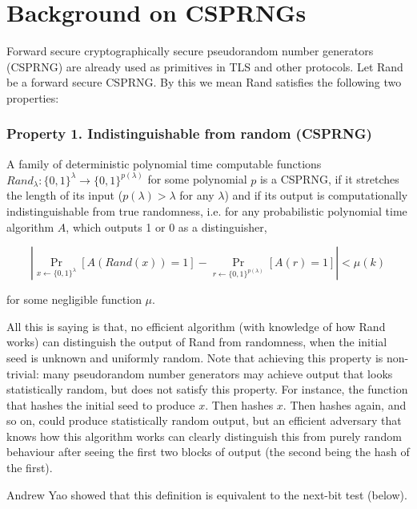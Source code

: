 \documentclass{article}
\begin{document}
\section{Background on CSPRNGs} \label{CSPRNG}
Forward secure cryptographically secure pseudorandom number generators (CSPRNG) are already used as primitives in TLS and other protocols. Let Rand be a forward secure CSPRNG. By this we mean Rand satisfies the following two properties:

\subsubsection*{Property 1. Indistinguishable from random (CSPRNG)}

A family of deterministic polynomial time computable functions $Rand_{\lambda}
\colon \{0, 1\}^{\lambda} \rightarrow \{0, 1 \}^{p(\lambda)}$ for some polynomial
$p$ is a  CSPRNG, if it stretches the length of its input ($p(\lambda) > \lambda$ for any $\lambda$) and if its output is computationally indistinguishable from true randomness, i.e. for any probabilistic polynomial time algorithm $A$, which outputs 1 or 0 as a distinguisher,

$$ \left \vert \Pr_{x\gets\{0,1\}^\lambda}[A(Rand(x))=1] - \Pr_{r\gets\{0,1\}^{p(\lambda)}}[A(r)=1] \right \vert < \mu(k) $$

\noindent for some negligible function $\mu$.

All this is saying is that, no efficient algorithm (with knowledge of how Rand works) can distinguish the output of Rand from randomness, when the initial seed is unknown and uniformly random. Note that achieving this property is non-trivial: many pseudorandom number generators may achieve output that looks statistically random, but does not satisfy this property. For instance, the function that hashes the initial seed to produce $x$. Then hashes $x$. Then hashes again, and so on, could produce statistically random output, but an efficient adversary that knows how this algorithm works can clearly distinguish this from purely random behaviour after seeing the first two blocks of output (the second being the hash of the first).

Andrew Yao showed that this definition is equivalent to the next-bit test (below).
\end{document}
